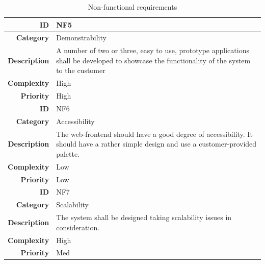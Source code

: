 \begin{table}[h]
\begin{center}
\begin{tabular}{ | r | p{11.5cm} | }
  \textbf{ID} & NF5 \\
  \hline\noalign{\smallskip}\hline
  \textbf{Category}     & Demonstrability \\
  \textbf{Description}  & A number of two or three, easy to use, prototype applications
                          shall be developed to showcase the functionality of the system to the customer \\
  \textbf{Complexity}   & High \\
  \textbf{Priority}     & High \\
  \hline\noalign{\smallskip}\noalign{\smallskip}\hline
  
  \textbf{ID} & NF6 \\
  \hline\noalign{\smallskip}\hline
  \textbf{Category}     & Accessibility \\
  \textbf{Description}  & The web-frontend should have a good degree of accessibility.
                          It should have a rather simple design and use a customer-provided palette. \\
  \textbf{Complexity}   & Low \\
  \textbf{Priority}     & Low \\

  \textbf{ID} & NF7 \\
  \hline\noalign{\smallskip}\hline
  \textbf{Category}     & Scalability \\
  \textbf{Description}  & The system shall be designed taking scalability issues in consideration. \\
  \textbf{Complexity}   & High \\
  \textbf{Priority}     & Med \\

  \hline
\end{tabular}
\end{center}
\caption{Non-functional requirements}
\label{table:nonfunc}
\end{table}

